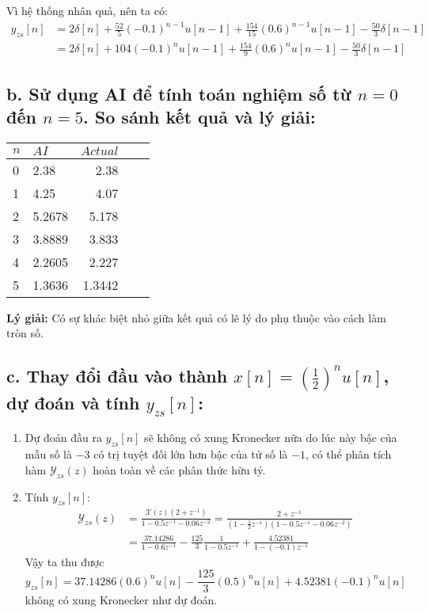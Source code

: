 \documentclass{article}
\begin{document}
Vì hệ thống nhân quả, nên ta có:
\begin{equation*}
    \begin{split}
y_{zs}[n]&=2\delta[n]+\frac{52}{5}(-0.1)^{n-1}u[n-1]+\frac{154}{15}(0.6)^{n-1}u[n-1]-\frac{50}{3}\delta[n-1] \\
&= 2\delta[n]+104(-0.1)^{n}u[n-1]+\frac{154}{9}(0.6)^{n}u[n-1]-\frac{50}{3}\delta[n-1]
    \end{split}
\end{equation*}
\subsection*{b. Sử dụng AI để tính toán nghiệm số từ $n=0$ đến $n=5$. So sánh kết quả và lý giải:}
\begin{center}
    \begin{tabular}{llrll}
        \toprule
        $n$   & $AI$   & $Actual$  \\
        \midrule
         0    & 2.38   & 2.38  \\
         1    & 4.25   & 4.07  \\
         2    & 5.2678   & 5.178  \\
         3    & 3.8889   & 3.833 \\
         4    & 2.2605   & 2.227 \\
         5    & 1.3636   & 1.3442 \\
        \bottomrule
        \end{tabular}
    \end{center}
\textbf{Lý giải:} Có sự khác biệt nhỏ giữa kết quả có lẽ lý do phụ thuộc vào cách làm tròn số.
\subsection*{c. Thay đổi đầu vào thành $x[n]=\left(\frac{1}{2}\right)^{n}u[n]$, dự đoán và tính $y_{zs}[n]$:}
\begin{enumerate}
    \item Dự đoán đầu ra $y_{zs}[n]$ sẽ không có xung Kronecker nữa do lúc này bậc của mẫu số là $-3$ có trị tuyệt đối lớn hơn bậc của tử số là $-1$, có thể phân tích hàm $\mathscr{Y}_{zs}(z)$ hoàn toàn về các phân thức hữu tỷ.
    \item Tính $y_{zs}[n]$:
        \begin{equation*}
            \begin{split}
                \mathscr{Y}_{zs}(z)&=\frac{\mathscr{X}(z)(2+z^{-1})}{1-0.5z^{-1}-0.06z^{-2}}=\frac{2+z^{-1}}{(1-\frac{1}{2}z^{-1})(1-0.5z^{-1}-0.06z^{-2})}\\
                &=\frac{37.14286}{1-0.6z^{-1}}-\frac{125}{3}\frac{1}{1-0.5z^{-1}}+\frac{4.52381}{1-(-0.1)z^{-1}}
            \end{split}
        \end{equation*}
        Vậy ta thu được $$y_{zs}[n]=37.14286(0.6)^{n}u[n]-\frac{125}{3}(0.5)^{n}u[n]+4.52381(-0.1)^{n}u[n]$$ không có xung Kronecker như dự đoán.
\end{enumerate}
\end{document}
